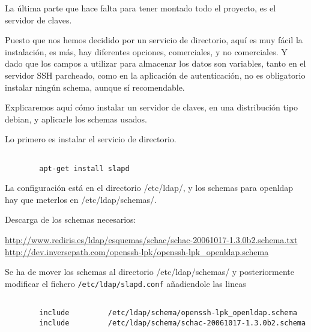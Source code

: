         La última parte que hace falta para tener montado todo el
        proyecto, es el servidor de claves.

        Puesto que nos hemos decidido por un servicio de directorio,
        aquí es muy fácil la instalación, es más, hay diferentes
        opciones, comerciales, y no comerciales. Y dado que los
        campos a utilizar para almacenar los datos son variables,
        tanto en el servidor SSH parcheado, como en la aplicación de
        autenticación, no es obligatorio instalar ningún schema,
        aunque sí recomendable.

        Explicaremos aquí cómo instalar un servidor de claves, en una
        distribución tipo debian, y aplicarle los schemas usados.

        Lo primero es instalar el servicio de directorio.

        \begin{verbatim}

        apt-get install slapd

        \end{verbatim}

        La configuración está en el directorio /etc/ldap/, y los
        schemas para openldap hay que meterlos en /etc/ldap/schemas/.

        Descarga de los schemas necesarios:

        \url{http://www.rediris.es/ldap/esquemas/schac/schac-20061017-1.3.0b2.schema.txt}
        \url{http://dev.inversepath.com/openssh-lpk/openssh-lpk\_openldap.schema}


        Se ha de mover los schemas al directorio /etc/ldap/schemas/ y
        posteriormente modificar el fichero
        \texttt{/etc/ldap/slapd.conf} añadiendole las lineas

        \begin{verbatim}

        include         /etc/ldap/schema/openssh-lpk_openldap.schema
        include         /etc/ldap/schema/schac-20061017-1.3.0b2.schema

        \end{verbatim}
